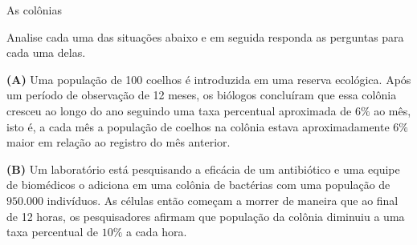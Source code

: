 \begin{task}{As colônias}

Analise cada uma das situações abaixo e em seguida responda as perguntas para cada uma delas.

 \textbf{(A)} Uma população de 100 coelhos é introduzida em uma reserva ecológica. Após um período de observação de 12 meses, os biólogos concluíram que essa colônia cresceu ao longo do ano seguindo uma taxa percentual aproximada de $6\%$ ao mês, isto é, a cada mês a população de coelhos na colônia estava aproximadamente $6\%$ maior em relação ao registro do mês anterior.


 \textbf{(B)} Um laboratório está pesquisando a eficácia de um antibiótico e uma equipe de biomédicos o adiciona em uma colônia de bactérias com uma população de $950.000$ indivíduos. As células então começam a morrer de maneira que ao final de 12 horas, os pesquisadores afirmam que população da colônia diminuiu a uma taxa percentual de $10\%$ a cada hora.

\begin{enumerate}
%
%
%
%
%
%
%


\end{enumerate}
\end{task}
